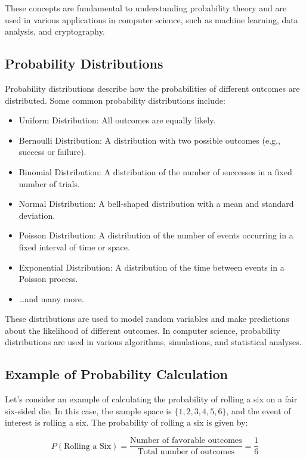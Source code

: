 These concepts are fundamental to understanding probability theory and are used in various applications in computer science, such as machine learning, data analysis, and cryptography.

\subsection{Probability Distributions}

Probability distributions describe how the probabilities of different outcomes are distributed. Some common probability distributions include:

\begin{itemize}
    \item Uniform Distribution: All outcomes are equally likely.
    \item Bernoulli Distribution: A distribution with two possible outcomes (e.g., success or failure).
    \item Binomial Distribution: A distribution of the number of successes in a fixed number of trials.
    \item Normal Distribution: A bell-shaped distribution with a mean and standard deviation.
    \item Poisson Distribution: A distribution of the number of events occurring in a fixed interval of time or space.
    \item Exponential Distribution: A distribution of the time between events in a Poisson process.
    \item \ldots and many more.
\end{itemize}

These distributions are used to model random variables and make predictions about the likelihood of different outcomes. In computer science, probability distributions are used in various algorithms, simulations, and statistical analyses.

\subsection{Example of Probability Calculation}

Let's consider an example of calculating the probability of rolling a six on a fair six-sided die. In this case, the sample space is $\{1, 2, 3, 4, 5, 6\}$, and the event of interest is rolling a six. The probability of rolling a six is given by:

\[
P(\text{Rolling a Six}) = \frac{\text{Number of favorable outcomes}}{\text{Total number of outcomes}} = \frac{1}{6}
\]

